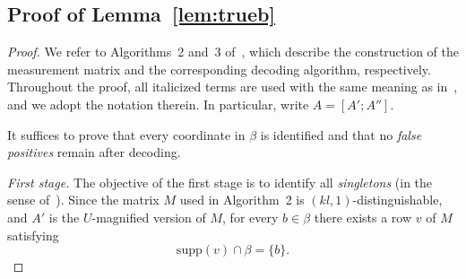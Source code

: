\documentclass[10pt,a4paper]{amsart}
\newcommand{\xl}[1]{{\color{blue}#1}}
\newcommand{\supp}{\mathrm{supp}}
\newcommand{\sign}{\mathrm{sign}}
\begin{document}
\subsection{Proof of Lemma~\ref{lem:trueb}}
\begin{proof}





We refer to Algorithms~2 and~3 of~\cite{li2025support}, which describe the construction of the measurement matrix and the corresponding decoding algorithm, respectively. Throughout the proof, all italicized terms are used with the same meaning as in~\cite{li2025support}, and we adopt the notation therein. In particular, write $A=[A';A'']$.

It suffices to prove that every coordinate in $\beta$ is identified and that no \emph{false positives} remain after decoding.

\emph{First stage.}
The objective of the first stage is to identify all \emph{singletons} (in the sense of~\cite{li2025support}). Since the matrix $M$ used in Algorithm~2 is $(kl,1)$-distinguishable, and $A'$ is the $U$-magnified version of $M$, for every $b\in\beta$ there exists a row $v$ of $M$ satisfying
\[
\supp(v)\cap\beta=\{b\}.
\]


\end{proof}
\end{document}
